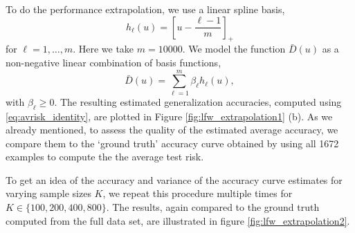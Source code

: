 To do the performance extrapolation, we use a linear
spline basis,
\[
h_\ell(u) = \left[u - \frac{\ell - 1}{m}\right]_+
\]
for $\ell = 1,\hdots, m$.  Here we take $m = 10000$.  We model the
function $\bar{D}(u)$ as a non-negative linear combination of basis
functions,
\[
\bar{D}(u) = \sum_{\ell = 1}^m \beta_\ell h_\ell(u),
\]
with $\beta_\ell \geq 0$.  The resulting estimated generalization
accuracies, computed using \eqref{eq:avrisk_identity}, are plotted in
Figure \eqref{fig:lfw_extrapolation1} (b).  As we already mentioned, to
assess the quality of the estimated average accuracy, we compare them
to the `ground truth' accuracy curve obtained by using all 1672
examples to compute the the average test risk.



To get an idea of the accuracy and variance of the accuracy curve
estimates for varying sample sizes $K$, we repeat this procedure
multiple times for $K \in \{100,200,400, 800\}$.  The results, again
compared to the ground truth computed from the full data set, are
illustrated in figure \ref{fig:lfw_extrapolation2}.

